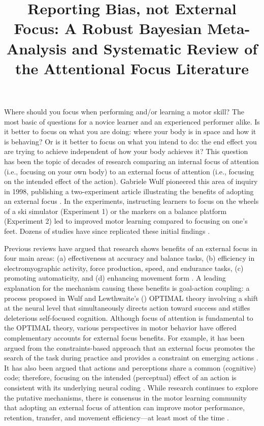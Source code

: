 \documentclass[man,floatsintext,letterpaper,12pt]{apa7}
\title{Reporting Bias, not External Focus: A Robust Bayesian Meta-Analysis and Systematic Review of the Attentional Focus Literature}
\begin{document}
\maketitle

Where should you focus when performing and/or learning a motor skill? The most basic of questions for a novice learner and an experienced performer alike. Is it better to focus on what you are doing: where your body is in space and how it is behaving? Or is it better to focus on what you intend to do: the end effect you are trying to achieve independent of how your body achieves it? This question has been the topic of decades of research comparing an internal focus of attention (i.e., focusing on your own body) to an external focus of attention (i.e., focusing on the intended effect of the action). Gabriele Wulf pioneered this area of inquiry in 1998, publishing a two-experiment article illustrating the benefits of adopting an external focus \autocite{wulf1998-meta}. In the experiments, instructing learners to focus on the wheels of a ski simulator (Experiment 1) or the markers on a balance platform (Experiment 2) led to improved motor learning compared to focusing on one's feet. Dozens of studies have since replicated these initial findings \autocites[see][for reviews]{wulf2007,wulf2013}.

Previous reviews have argued that research shows benefits of an external focus in four main areas: (a) effectiveness at accuracy and balance tasks, (b) efficiency in electromyographic activity, force production, speed, and endurance tasks, (c) promoting automaticity, and (d) enhancing movement form \autocite{chua2021,wulf2016,wulf2013,wulf2007}. A leading explanation for the mechanism causing these benefits is goal-action coupling: a process proposed in Wulf and Lewthwaite's (\citeyear{wulf2016}) OPTIMAL theory involving a shift at the neural level that simultaneously directs action toward success and stifles deleterious self-focused cognition. Although focus of attention is fundamental to the OPTIMAL theory, various perspectives in motor behavior have offered complementary accounts for external focus benefits. For example, it has been argued from the constraints-based approach that an external focus promotes the search of the task during practice and provides a constraint on emerging actions \autocite{davids2003}. It has also been argued that actions and perceptions share a common (cognitive) code; therefore, focusing on the intended (perceptual) effect of an action is consistent with its underlying neural coding \autocite{wulf2001,prinz1990,hommel2001}. While research continues to explore the putative mechanisms, there is consensus in the motor learning community that adopting an external focus of attention can improve motor performance, retention, transfer, and movement efficiency---at least most of the time \autocite{lee2021a,chua2021,makaruk2020,kim2017,li2022,grgic2021,grgic2022,nicklas2022}.\footnotemark{}
\end{document}
